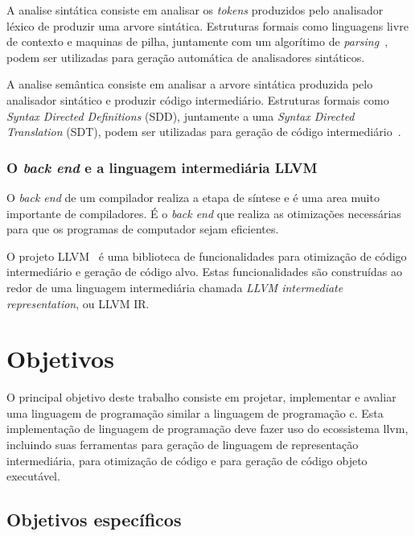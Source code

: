 \documentclass[
  12pt,
  openright,
  twoside,
  a4paper,
  english,
  brazil
]{abntex2}
\begin{document}
A analise sintática consiste em analisar os \textit{tokens} produzidos pelo analisador léxico de produzir uma arvore sintática.
Estruturas formais como linguagens livre de contexto e maquinas de pilha, juntamente com um algorítimo de \textit{parsing}~\cite{knuth1965translation}, podem ser utilizadas para geração automática de analisadores sintáticos.

A analise semântica consiste em analisar a arvore sintática produzida pelo analisador sintático e produzir código intermediário.
Estruturas formais como \textit{Syntax Directed Definitions} (SDD), juntamente a uma \textit{Syntax Directed Translation} (SDT), podem ser utilizadas para geração de código intermediário~\cite{Aho:2006:CPT:1177220}.

\subsection{O \textit{back end} e a linguagem intermediária LLVM}\label{cap:introducao:sec:o_back_end}

O \textit{back end} de um compilador realiza a etapa de síntese e é uma area muito importante de compiladores.
É o \textit{back end} que realiza as otimizações necessárias para que os programas de computador sejam eficientes.

O projeto LLVM~\cite{lattner2004llvm} é uma biblioteca de funcionalidades para otimização de código intermediário e geração de código alvo.
Estas funcionalidades são construídas ao redor de uma linguagem intermediária chamada \textit{LLVM intermediate representation}, ou LLVM IR\@.

\chapter{Objetivos}\label{cap:objetivos}

O principal objetivo deste trabalho consiste em projetar, implementar e avaliar uma linguagem de programação similar a linguagem de programação c.
Esta implementação de linguagem de programação deve fazer uso do ecossistema llvm, incluindo suas ferramentas para geração de linguagem de representação intermediária, para otimização de código e para geração de código objeto executável.

\section{Objetivos específicos}
\end{document}
